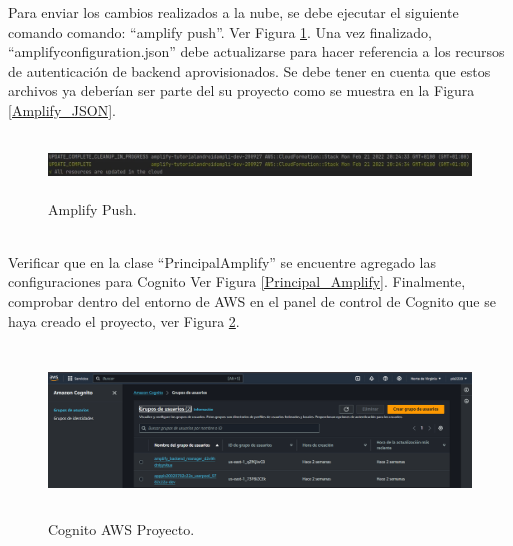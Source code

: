 \documentclass[a4paper,10pt, oneside, titlepage]{article}
\begin{document}
	\indent Para enviar los cambios realizados a la nube, se debe ejecutar el siguiente comando comando: ``amplify push''. Ver Figura \ref{Amplify_Push}. Una vez finalizado, ``amplifyconfiguration.json'' debe actualizarse para hacer referencia a los recursos de autenticación de backend aprovisionados. Se debe tener en cuenta que estos archivos ya deberían ser parte del su proyecto como se muestra en la Figura \ref{Amplify_JSON}.
	\begin{figure}[!h]
		\centering
		\includegraphics[width = 1\linewidth, height = 1.6cm]{Amplify_Push.png}
		\caption{Amplify Push.}
		\label{Amplify_Push}
	\end{figure} \\
	\indent Verificar que en la clase ``PrincipalAmplify'' se encuentre agregado las configuraciones para Cognito Ver Figura \ref{Principal_Amplify}. Finalmente, comprobar dentro del entorno de AWS en el panel de control de Cognito que se haya creado el proyecto, ver Figura \ref{Cognito_AWS_Proyecto}.
	\begin{figure}[!h]
		\centering
		\includegraphics[width = 1\linewidth, height = 4.5cm]{Cognito_AWS_Proyecto.png}
		\caption{Cognito AWS Proyecto.}
		\label{Cognito_AWS_Proyecto}
	\end{figure}
\end{document}
